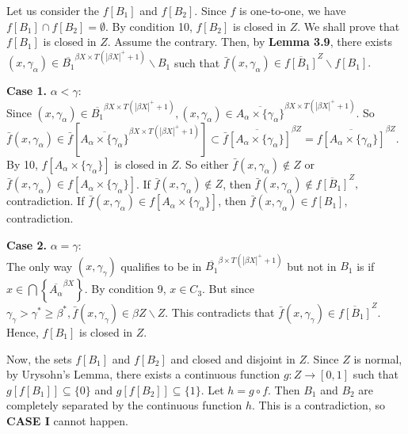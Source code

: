 \documentclass{article}
\begin{document}
Let us consider the $f\left[B_1\right]$ and $f\left[B_2\right].$ Since $f$ is one-to-one, we have $f\left[B_1\right] \cap f\left[B_2\right]=\emptyset.$ 
By condition 10, $f\left[B_2\right]$ is closed in $Z$. We shall prove that $f\left[B_1\right]$ is closed in $Z$. Assume the contrary. Then, by \textbf{Lemma 3.9}, there exists $(x,\gamma_\alpha)\in \overline{B_1}^{\beta X\times T(|\beta X|^+ +1)} \backslash B_1$ such that $\bar{f}(x,\gamma_\alpha)\in \overline{f\left[B_1\right]}^Z\backslash f\left[B_1\right].$ 
\vskip 10pt

\textbf{Case 1.} $\alpha<\gamma:$\\
Since $(x,\gamma_\alpha)\in \overline{B_1}^{\beta X\times T(|\beta X|^+ +1)}, (x,\gamma_\alpha)\in \overline{A_\alpha\times \{\gamma_\alpha\}}^{\beta X \times T(|\beta X|^+ +1)}.$ So $\bar{f}(x,\gamma_\alpha)\in \bar{f}\left[\overline{A_\alpha\times \{\gamma_\alpha\}}^{\beta X\times T(|\beta X|^+ +1)}\right] \subset \overline{\bar{f}\left[A_\alpha\times \{\gamma_\alpha\}\right]}^{\beta Z}=\overline{f\left[A_\alpha\times \{\gamma_\alpha\}\right]}^{\beta Z}.$ 
\vskip 10pt
By 10, $f\left[A_\alpha\times \{\gamma_\alpha\}\right]$ is closed in $Z$. So either $\bar{f}(x,\gamma_\alpha)\notin Z$ or $\bar{f}(x,\gamma_\alpha)\in f\left[A_\alpha\times \{\gamma_\alpha\}\right]$. If $\bar{f}(x,\gamma_\alpha) \notin Z$, then $\bar{f}(x,\gamma_\alpha)\notin \overline{f\left[B_1\right]}^Z,$ contradiction. If $\bar{f}(x,\gamma_\alpha)\in f\left[A_\alpha\times \{\gamma_\alpha\}\right]$, then $\bar{f}(x,\gamma_\alpha)\in f\left[B_1\right], $contradiction.

\vskip 15pt

\textbf{Case 2.} $\alpha=\gamma:$\\
The only way $(x,\gamma_\gamma)$ qualifies to be in $\overline{B_1}^{\beta \times T(|\beta X|^+ +1)}$ but not in $B_1$ is if $x\in \bigcap \left\{\overline{A_\alpha}^{\beta X}\right\}$. By condition 9, $x\in C_3$. But since $\gamma_\gamma> \gamma^* \geq \beta^*, \bar{f}(x,\gamma_\gamma)\in \beta Z\backslash Z.$ This contradicts that $\bar{f}(x,\gamma_\gamma)\in \overline{f\left[B_1\right]}^Z.$ \vskip 10pt
Hence, $f\left[B_1\right]$ is closed in $Z$. 


\vskip 20pt

Now, the sets $f\left[B_1\right]$ and $f\left[B_2\right]$ and closed and disjoint in $Z$. Since $Z$ is normal, by Urysohn's Lemma, there exists a continuous function $g:Z\rightarrow [0,1]$ such that $g\left[ f\left[B_1\right]\right]\subseteq \{0\}$ and $g\left[f\left[B_2\right]\right]\subseteq \{1\}.$ Let $h=g\circ f.$ Then $B_1$ and $B_2$ are completely separated by the continuous function $h$. This is a contradiction, so \textbf{CASE I} cannot happen.  
\end{document}
